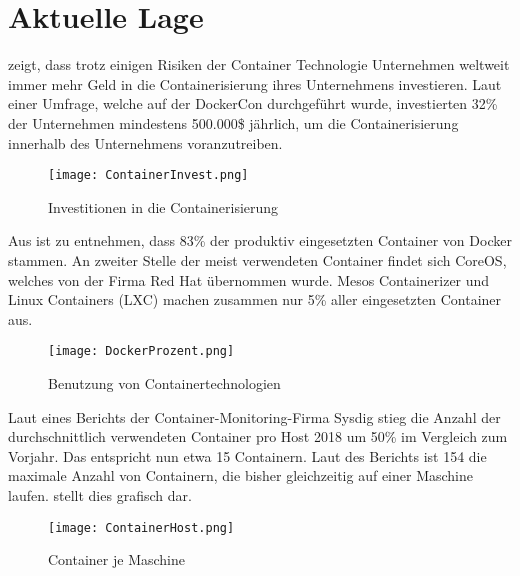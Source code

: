 \section{Aktuelle Lage}
\label{sec:AktuelleLage}
 zeigt, dass trotz einigen Risiken der Container Technologie Unternehmen weltweit immer mehr Geld in die Containerisierung ihres Unternehmens investieren. Laut einer Umfrage, welche auf der DockerCon durchgeführt wurde, investierten 32\% der Unternehmen mindestens 500.000\$ jährlich, um die Containerisierung innerhalb des Unternehmens voranzutreiben. \cite{Investments}
\begin{figure}[H]
	\begin{center}
		\texttt{[image: ContainerInvest.png]}
	\end{center}
	\caption[Investitionen in die Containerisierung]{Investitionen in die Containerisierung \footnotemark}
	\label{fig:Stats1}
\end{figure}
\newpage
Aus  ist zu entnehmen, dass 83\% der produktiv eingesetzten Container von Docker stammen. An zweiter Stelle der meist verwendeten Container findet sich CoreOS, welches von der Firma Red Hat übernommen wurde. Mesos Containerizer und Linux Containers (LXC) machen zusammen nur 5\% aller eingesetzten Container aus.
\begin{figure}[H]
	\begin{center}
		\texttt{[image: DockerProzent.png]}
	\end{center}
	\caption[Benutzung von Containertechnologien]{Benutzung von Containertechnologien \footnotemark}
	\label{fig:Stats2}
\end{figure}
Laut eines Berichts der Container-Monitoring-Firma Sysdig stieg die Anzahl der durchschnittlich verwendeten Container pro Host 2018 um 50\% im Vergleich zum Vorjahr. Das entspricht nun etwa 15 Containern. Laut des Berichts ist 154 die maximale Anzahl von Containern, die bisher gleichzeitig auf einer Maschine laufen.  stellt dies grafisch dar.
\begin{figure}[H]
	\begin{center}
		\texttt{[image: ContainerHost.png]}
	\end{center}
	\caption[Container je Maschine]{Container je Maschine \footnotemark}
	\label{fig:Stats3}
\end{figure}
